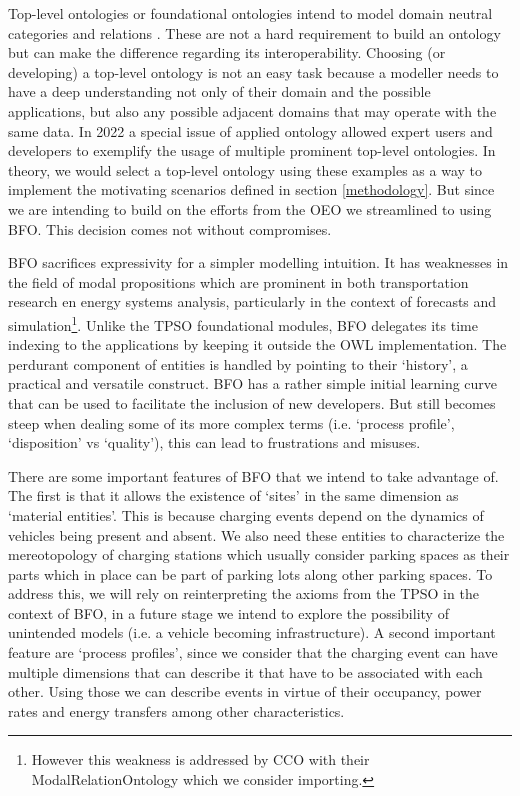 Top-level ontologies or foundational ontologies intend to model domain neutral
categories and relations \cite{Arp.2015}. These are not a hard requirement to
build an ontology but can make the difference regarding its interoperability.
Choosing (or developing) a top-level ontology is not an easy task because a
modeller needs to have a deep understanding not only of their domain and the
possible applications, but also any possible adjacent domains that may operate
with the same data. In 2022 a special issue of applied ontology
\cite{Borgo.2022} allowed expert users and developers to exemplify the usage of
multiple prominent top-level ontologies. In theory, we would select a top-level
ontology using these examples as a way to implement the motivating scenarios
defined in section \ref{methodology}. But since we are intending to build on
the efforts from the OEO we streamlined to using BFO. This decision comes not
without compromises. 

BFO sacrifices expressivity for a simpler modelling intuition. It has weaknesses
in the field of modal propositions which are prominent in both transportation
research en energy systems analysis, particularly in the context of forecasts
and simulation\footnote{However this weakness is addressed by CCO with their
ModalRelationOntology which we consider importing. }. Unlike the TPSO
foundational modules, BFO delegates its time indexing to the applications by
keeping it outside the OWL implementation. The perdurant component of entities
is handled by pointing to their `history', a practical and versatile construct.
BFO has a rather simple initial learning curve that can be used to facilitate
the inclusion of new developers. But still becomes steep when dealing some of
its more complex terms (i.e. `process profile', `disposition' vs `quality'),
this can lead to frustrations and misuses.

There are some important features of BFO that we intend to take advantage of.
The first is that it allows the existence of `sites' in the same dimension as
`material entities'. This is because charging events depend on the dynamics of
vehicles being present and absent. We also need these entities to characterize
the mereotopology of charging stations which usually consider parking spaces as
their parts which in place can be part of parking lots along other parking
spaces. To address this, we will rely on reinterpreting the axioms from the
TPSO in the context of BFO, in a future stage we intend to explore the
possibility of unintended models (i.e. a vehicle becoming infrastructure). A
second important feature are `process profiles', since we consider that the
charging event can have multiple dimensions that can describe it that have to
be associated with each other. Using those we can describe events in virtue of
their occupancy, power rates and energy transfers among other characteristics.
